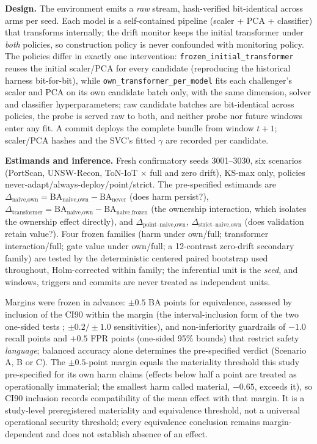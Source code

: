 \documentclass[journal]{IEEEtran}
\begin{document}
\textbf{Design.} The environment emits a \emph{raw} stream, hash-verified bit-identical across arms per seed. Each model is a self-contained pipeline (scaler + PCA + classifier) that transforms internally; the drift monitor keeps the initial transformer under \emph{both} policies, so construction policy is never confounded with monitoring policy. The policies differ in exactly one intervention: \texttt{frozen\_initial\_transformer} reuses the initial scaler/PCA for every candidate (reproducing the historical harness bit-for-bit), while \texttt{own\_transformer\_per\_model} fits each challenger's scaler and PCA on its own candidate batch only, with the same dimension, solver and classifier hyperparameters; raw candidate batches are bit-identical across policies, the probe is served raw to both, and neither probe nor future windows enter any fit. A commit deploys the complete bundle from window $t{+}1$; scaler/PCA hashes and the SVC's fitted $\gamma$ are recorded per candidate.

\textbf{Estimands and inference.} Fresh confirmatory seeds 3001--3030, six scenarios (PortScan, UNSW-Recon, ToN-IoT $\times$ full and zero drift), KS-max only, policies never-adapt/always-deploy/point/strict. The pre-specified estimands are $\Delta_{\text{naive,own}} = \mathrm{BA}_{\text{naive,own}} - \mathrm{BA}_{\text{never}}$ (does harm persist?), $\Delta_{\text{transformer}} = \mathrm{BA}_{\text{naive,own}} - \mathrm{BA}_{\text{naive,frozen}}$ (the ownership interaction, which isolates the ownership effect directly), and $\Delta_{\text{point--naive,own}}$, $\Delta_{\text{strict--naive,own}}$ (does validation retain value?). Four frozen families (harm under own/full; transformer interaction/full; gate value under own/full; a 12-contrast zero-drift secondary family) are tested by the deterministic centered paired bootstrap used throughout, Holm-corrected within family; the inferential unit is the \emph{seed}, and windows, triggers and commits are never treated as independent units.

Margins were frozen in advance: $\pm0.5$ BA points for equivalence, assessed by inclusion of the CI90 within the margin (the interval-inclusion form of the two one-sided tests \cite{schuirmann1987comparison}; $\pm0.2/\pm1.0$ sensitivities), and non-inferiority guardrails of $-1.0$ recall points and $+0.5$ FPR points (one-sided 95\% bounds) that restrict safety \emph{language}; balanced accuracy alone determines the pre-specified verdict (Scenario A, B or C). The $\pm0.5$-point margin equals the materiality threshold this study pre-specified for its own harm claims (effects below half a point are treated as operationally immaterial; the smallest harm called material, $-0.65$, exceeds it), so CI90 inclusion records compatibility of the mean effect with that margin. It is a study-level preregistered materiality and equivalence threshold, not a universal operational security threshold; every equivalence conclusion remains margin-dependent and does not establish absence of an effect.
\end{document}
